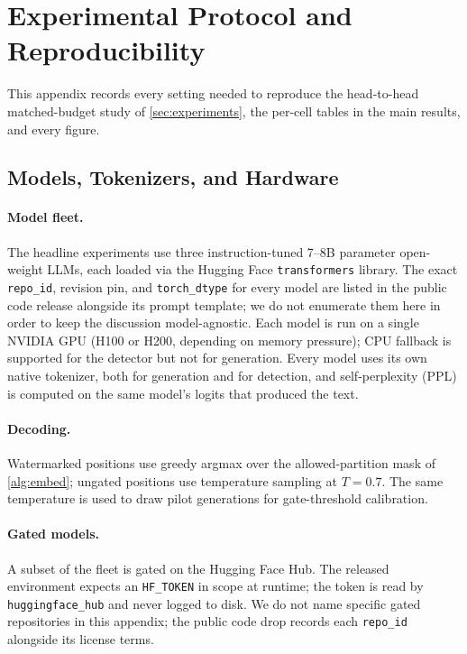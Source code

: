 \section{Experimental Protocol and Reproducibility}
\label{app:repro}

This appendix records every setting needed to reproduce the
head-to-head matched-budget study of \autoref{sec:experiments},
the per-cell tables in the main results, and every figure.

\subsection{Models, Tokenizers, and Hardware}

\paragraph{Model fleet.} The headline experiments use three
instruction-tuned 7--8B parameter open-weight LLMs, each loaded via
the Hugging Face \texttt{transformers} library. The exact
\texttt{repo\_id}, revision pin, and \texttt{torch\_dtype} for every
model are listed in the public code release alongside its prompt
template; we do not enumerate them here in order to keep the
discussion model-agnostic. Each model is run on a single NVIDIA GPU
(H100 or H200, depending on memory pressure); CPU fallback is
supported for the detector but not for generation. Every model uses
its own native tokenizer, both for generation and for detection,
and self-perplexity (PPL) is computed on the same model's logits
that produced the text.

\paragraph{Decoding.} Watermarked positions use greedy argmax over
the allowed-partition mask of \autoref{alg:embed}; ungated positions
use temperature sampling at $T = 0.7$. The same temperature is used
to draw pilot generations for gate-threshold calibration.

\paragraph{Gated models.} A subset of the fleet is gated on the
Hugging Face Hub. The released environment expects an
\texttt{HF\_TOKEN} in scope at runtime; the token is read by
\texttt{huggingface\_hub} and never logged to disk. We do not name
specific gated repositories in this appendix; the public code drop
records each \texttt{repo\_id} alongside its license terms.

